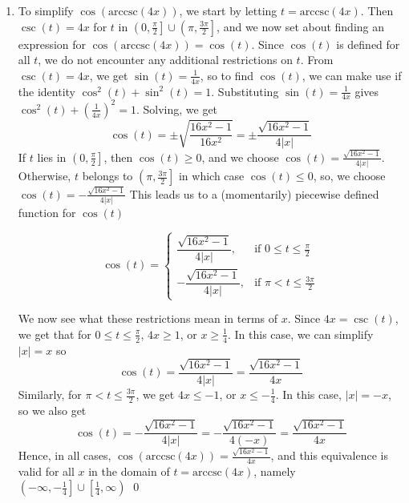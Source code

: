 \begin{ex}
\begin{enumerate}
\begin{enumerate}
\item To simplify $\cos(\mbox{arccsc}(4x))$, we start by letting $t = \mbox{arccsc}(4x)$.   Then $\csc(t) = 4x$ for $t$ in $\left(0, \frac{\pi}{2} \right] \cup \left(\pi, \frac{3\pi}{2} \right]$, and we now set about finding an expression for  $\cos(\mbox{arccsc}(4x)) = \cos(t)$.  Since $\cos(t)$ is defined for all $t$, we do not encounter any additional restrictions on $t$.  From $\csc(t) = 4x$, we get $\sin(t) = \frac{1}{4x}$, so to find $\cos(t)$, we can make use if the identity $\cos^{2}(t) + \sin^{2}(t) = 1$.  Substituting $\sin(t) = \frac{1}{4x}$  gives $\cos^{2}(t) + \left(\frac{1}{4x}\right)^2 = 1$.  Solving, we get \[\cos(t) = \pm \sqrt{\frac{16x^2-1}{16x^2}} = \pm \frac{\sqrt{16x^2-1}}{4|x|}\]  If $t$ lies in $\left(0, \frac{\pi}{2} \right]$, then $\cos(t) \geq 0$, and we choose  $\cos(t) = \frac{\sqrt{16x^2-1}}{4|x|}$. Otherwise, $t$ belongs to $\left( \pi, \frac{3\pi}{2} \right]$ in which case $\cos(t) \leq 0$, so, we choose $\cos(t) = -\frac{\sqrt{16x^2-1}}{4|x|}$ This leads us to a (momentarily) piecewise defined function for $\cos(t)$

\[ \cos(t) = \left\{ \begin{array}{rr} \dfrac{\sqrt{16x^2-1}}{4|x|}, & \text{if $0 \leq t \leq \frac{\pi}{2}$} \\ [5pt]  -\dfrac{\sqrt{16x^2-1}}{4|x|}, & \text{if $\pi < t \leq \frac{3\pi}{2}$}  \end{array}\right. \]

We now see what these restrictions mean in terms of $x$.  Since $4x = \csc(t)$, we get that for $0 \leq t \leq \frac{\pi}{2}$, $4x \geq 1$, or $x \geq \frac{1}{4}$.  In this case, we can simplify $|x| = x$ so \[\cos(t) = \frac{\sqrt{16x^2-1}}{4|x|} = \frac{\sqrt{16x^2-1}}{4x}\]  Similarly, for $\pi < t \leq \frac{3\pi}{2}$, we get $4x \leq -1$, or $x \leq -\frac{1}{4}$.  In this case, $|x| = -x$, so we also get \[\cos(t) = -\frac{\sqrt{16x^2-1}}{4|x|}  = -\frac{\sqrt{16x^2-1}}{4(-x)} =  \frac{\sqrt{16x^2-1}}{4x}\]  Hence, in all cases, $\cos(\mbox{arccsc}(4x)) =  \frac{\sqrt{16x^2-1}}{4x}$, and this equivalence is valid for all $x$ in the domain of $t = \mbox{arccsc}(4x)$, namely $\left(-\infty, -\frac{1}{4}\right] \cup \left[ \frac{1}{4}, \infty \right)$  \qed

\end{enumerate}

\end{enumerate}

\end{ex}

